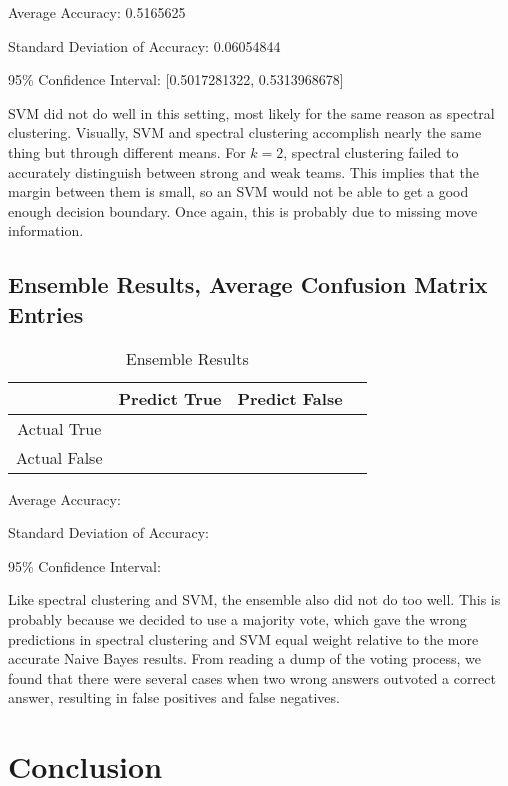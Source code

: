 \documentclass{acm_proc_article-sp}
\begin{document}
Average Accuracy: 0.5165625

Standard Deviation of Accuracy: 0.06054844

95\% Confidence Interval: [0.5017281322, 0.5313968678]

SVM did not do well in this setting, most likely for the same reason as spectral clustering. Visually, SVM and spectral clustering accomplish nearly the same thing but through different means. For $k=2$, spectral clustering failed to accurately distinguish between strong and weak teams. This implies that the margin between them is small, so an SVM would not be able to get a good enough decision boundary. Once again, this is probably due to missing move information.

\subsection{Ensemble Results, Average Confusion Matrix Entries}

\begin{table}

\centering

\caption{Ensemble Results}

\begin{tabular}{|c|c|c|l|} \hline

 & Predict True & Predict False \\ \hline
Actual True & & \\ \hline
Actual False & & \\ \hline

\end{tabular}

\end{table}

Average Accuracy: 

Standard Deviation of Accuracy: 

95\% Confidence Interval: 

Like spectral clustering and SVM, the ensemble also did not do too well. This is probably because we decided to use a majority vote, which gave the wrong predictions in spectral clustering and SVM equal weight relative to the more accurate Naive Bayes results. From reading a dump of the voting process, we found that there were several cases when two wrong answers outvoted a correct answer, resulting in false positives and false negatives.

\section{Conclusion}
\end{document}
